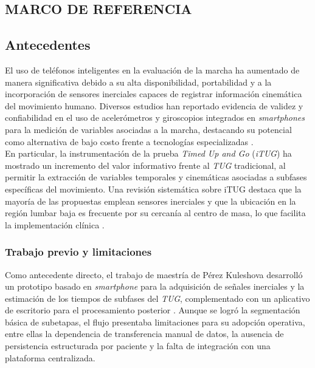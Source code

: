 \documentclass[12pt]{report}
\begin{document}
\begin{justify}
    \chapter{MARCO DE REFERENCIA}
    \label{ch:metodologia}

    \section{Antecedentes}

    El uso de teléfonos inteligentes en la evaluación de la marcha ha aumentado de manera significativa debido a su alta disponibilidad, portabilidad y a la incorporación de sensores inerciales capaces de registrar información cinemática del movimiento humano. Diversos estudios han reportado evidencia de validez y confiabilidad en el uso de acelerómetros y giroscopios integrados en \textit{smartphones} para la medición de variables asociadas a la marcha, destacando su potencial como alternativa de bajo costo frente a tecnologías especializadas \cite{reliabilty-smartphone-kinematic,subtasks}.\\

    En particular, la instrumentación de la prueba \textit{Timed Up and Go} (\textit{iTUG}) ha mostrado un incremento del valor informativo frente al \textit{TUG} tradicional, al permitir la extracción de variables temporales y cinemáticas asociadas a subfases específicas del movimiento. Una revisión sistemática sobre iTUG destaca que la mayoría de las propuestas emplean sensores inerciales y que la ubicación en la región lumbar baja es frecuente por su cercanía al centro de masa, lo que facilita la implementación clínica \cite{iTUG}.

    \subsection{Trabajo previo y limitaciones}

    Como antecedente directo, el trabajo de maestría de Pérez Kuleshova desarrolló un prototipo basado en \textit{smartphone} para la adquisición de señales inerciales y la estimación de los tiempos de subfases del \textit{TUG}, complementado con un aplicativo de escritorio para el procesamiento posterior \cite{Sistema-portable-TUG-AKuleshov}. Aunque se logró la segmentación básica de subetapas, el flujo presentaba limitaciones para su adopción operativa, entre ellas la dependencia de transferencia manual de datos, la ausencia de persistencia estructurada por paciente y la falta de integración con una plataforma centralizada.\\


\end{justify}
\end{document}
